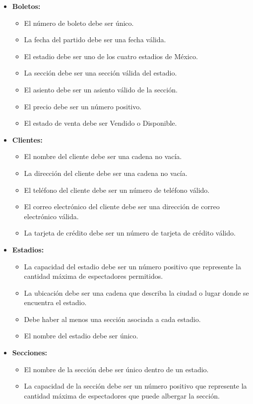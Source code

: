\begin{itemize}
    \item \textbf{Boletos:}
        \begin{itemize}
            \item El número de boleto debe ser único.
            \item La fecha del partido debe ser una fecha válida.
            \item El estadio debe ser uno de los cuatro estadios de México.
            \item La sección debe ser una sección válida del estadio.
            \item El asiento debe ser un asiento válido de la sección.
            \item El precio debe ser un número positivo.
            \item El estado de venta debe ser Vendido o Disponible.
        \end{itemize}

    \item \textbf{Clientes:}
        \begin{itemize}
            \item El nombre del cliente debe ser una cadena no vacía.
            \item La dirección del cliente debe ser una cadena no vacía.
            \item El teléfono del cliente debe ser un número de teléfono válido.
            \item El correo electrónico del cliente debe ser una dirección de correo electrónico válida.
            \item La tarjeta de crédito debe ser un número de tarjeta de crédito válido.
        \end{itemize}

    \item \textbf{Estadios:}
        \begin{itemize}
            \item La capacidad del estadio debe ser un número positivo que represente la cantidad máxima de espectadores permitidos.
            \item La ubicación debe ser una cadena que describa la ciudad o lugar donde se encuentra el estadio.
            \item Debe haber al menos una sección asociada a cada estadio.
            \item El nombre del estadio debe ser único.
        \end{itemize}
    \item \textbf{Secciones:}
        \begin{itemize}
            \item El nombre de la sección debe ser único dentro de un estadio.
            \item La capacidad de la sección debe ser un número positivo que represente la cantidad máxima de espectadores que puede albergar la sección.
        \end{itemize}    


\end{itemize}
